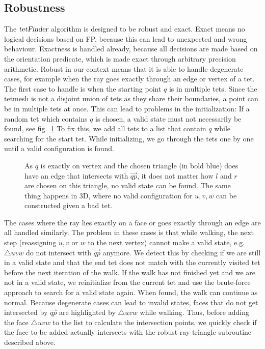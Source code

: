 \documentclass[../thesis.tex]{subfiles}
\begin{document}
\subsection{Robustness}\label{subsec:degenerate}
The $\textsl{tetFinder}$ algorithm is designed to be robust and exact.
Exact means no logical decisions
based on FP, because this can lead to unexpected and wrong behaviour.
Exactness is handled already, because all decisions are made based on the orientation predicate,
which is made exact through arbitrary precision arithmetic.
Robust in our context means that it is able to handle degenerate cases, for example when
the ray goes exactly through an edge or vertex of a tet.
The first case to handle is when the starting point $q$ is in multiple tets.
Since the tetmesh is not a disjoint union of tets as they share their boundaries,
a point can be in multiple tets at once. This can lead to problems in the initialization:
If a random tet which contains $q$ is chosen, a valid state must not necessarily be found, see fig.~\ref{fig:validstatefail}
To fix this, we add all tets to a list that contain $q$ while searching for the start tet.
While initializing, we go through the tets one by one until a valid configuration is found.
\begin{figure}[htb]
  \centering
  \def\svgwidth{20em}
  
  \caption{As $q$ is exactly on vertex and the chosen triangle (in bold blue) does
  have an edge that intersects with $\Vec{qp}$,
  it does not matter how $l$ and $r$ are chosen on this triangle, no valid state can be found.
  The same thing happens in 3D, where no valid configuration for $u,v,w$ can be constructed given a bad tet.
  }\label{fig:validstatefail}
\end{figure}
The cases where the ray lies exactly on a face or goes exactly through an edge are all handled similarly.
The problem in these cases is that while walking, the next step (reassigning $u,v$ or $w$ to the next vertex) cannot
make a valid state, e.g. $\triangle uvw$ do not intersect with $\Vec{qp}$ anymore.
We detect this by checking if we are still in a valid state and that the end tet does not
match with the currently visited tet before the next iteration of the walk.
If the walk has not finished yet and we are not in a valid state, we reinitialize from the current tet and use the brute-force approach to search
for a valid state again. When found, the walk can continue as normal.
Because degenerate cases can lead to invalid states, faces that do not get intersected
by $\Vec{qp}$ are highlighted by $\triangle uvw$ while walking.
Thus, before adding the face $\triangle uvw$ to the list to calculate the intersection points,
we quickly check if the face to be added actually intersects with the robust ray-triangle subroutine described above.
\end{document}

